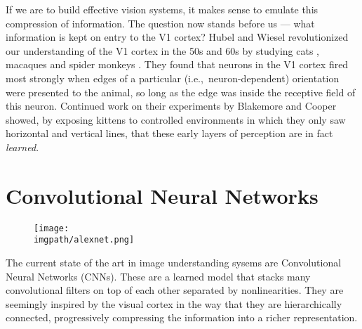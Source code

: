 If we are to build effective vision systems, it makes sense to emulate this
compression of information.
The question now stands before us --- what information is kept on entry to the V1 cortex?
Hubel and Wiesel revolutionized our understanding of the V1 cortex in the 50s and 60s by 
studying cats \cite{hubel_receptive_1959, hubel_receptive_1962}, macaques and spider 
monkeys \cite{hubel_receptive_1968}. They found that neurons in the V1 cortex fired
most strongly when edges of a particular (i.e.,\ neuron-dependent) orientation
were presented to the animal, so long as the edge was inside the receptive field of
this neuron.
Continued work on their experiments by Blakemore and Cooper
\cite{blakemore_development_1970} showed, by exposing
kittens to controlled environments in which they only saw horizontal and
vertical lines, that these early layers of perception are in fact \emph{learned}. 

\section{Convolutional Neural Networks}
  \begin{figure}
    \centering
      \texttt{[image: \\imgpath/alexnet.png]}
      \label{fig:ch1:cnn_arch}
    \end{figure}
The current state of the art in image understanding sysems are 
Convolutional Neural Networks (CNNs). These are a learned model that
stacks many convolutional filters on top of each other separated by
nonlinearities. 
They are seemingly inspired by the visual cortex in the way that they are
hierarchically connected, progressively compressing the information into a
richer representation. 

